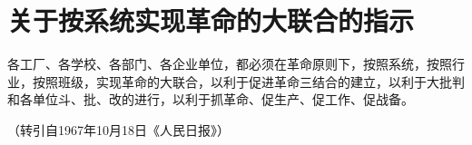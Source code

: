 \section[关于按系统实现革命的大联合的指示（一九六七年十月十七日）]{关于按系统实现革命的大联合的指示}


各工厂、各学校、各部门、各企业单位，都必须在革命原则下，按照系统，按照行业，按照班级，实现革命的大联合，以利于促进革命三结合的建立，以利于大批判和各单位斗、批、改的进行，以利于抓革命、促生产、促工作、促战备。

{\raggedleft （转引自1967年10月18日《人民日报》）\par}


